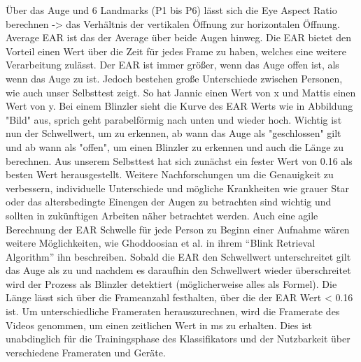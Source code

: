 Über das Auge und 6 Landmarks (P1 bis P6) lässt sich die Eye Aspect Ratio berechnen -> das Verhältnis der vertikalen Öffnung zur horizontalen Öffnung. Average EAR ist das der Average über beide Augen hinweg. Die EAR bietet den Vorteil einen Wert über die Zeit für jedes Frame zu haben, welches eine weitere Verarbeitung zulässt. Der EAR ist immer größer, wenn das Auge offen ist, als wenn das Auge zu ist. Jedoch bestehen große Unterschiede zwischen Personen, wie auch unser Selbsttest zeigt. So hat Jannic einen Wert von x und Mattis einen Wert von y. Bei einem Blinzler sieht die Kurve des EAR Werts wie in Abbildung "Bild" aus, sprich geht parabelförmig nach unten und wieder hoch. Wichtig ist nun der Schwellwert, um zu erkennen, ab wann das Auge als "geschlossen" gilt und ab wann als "offen", um einen Blinzler zu erkennen und auch die Länge zu berechnen. Aus unserem Selbsttest hat sich zunächst ein fester Wert von 0.16 als besten Wert herausgestellt. Weitere Nachforschungen um die Genauigkeit zu verbessern, individuelle Unterschiede und mögliche Krankheiten wie grauer Star oder das altersbedingte Einengen der Augen zu betrachten sind wichtig und sollten in zukünftigen Arbeiten näher betrachtet werden. Auch eine agile Berechnung der EAR Schwelle für jede Person zu Beginn einer Aufnahme wären weitere Möglichkeiten, wie Ghoddoosian et al. in ihrem “Blink Retrieval Algorithm” \cite{GH19} ihn beschreiben. Sobald die EAR den Schwellwert unterschreitet gilt das Auge als zu und nachdem es daraufhin den Schwellwert wieder überschreitet wird der Prozess als Blinzler detektiert (möglicherweise alles als Formel). Die Länge lässt sich über die Frameanzahl festhalten, über die der EAR Wert < 0.16 ist. Um unterschiedliche Frameraten herauszurechnen, wird die Framerate des Videos genommen, um einen zeitlichen Wert in ms zu erhalten. Dies ist unabdinglich für die Trainingsphase des Klassifikators und der Nutzbarkeit über verschiedene Frameraten und Geräte.

